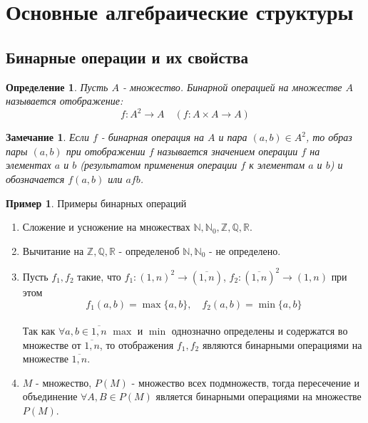 \documentclass[12pt,oneside]{article}
\newtheorem{determ}[theorem]{Определение}
\newtheorem{ffff}[theorem]{Замечание}
\theoremstyle{definition}
\newtheorem{example}[theorem]{Пример}
\newcommand{\ZZ}{\mathbb{Z}}
\newcommand{\NN}{\mathbb{N}}
\newcommand{\QQ}{\mathbb{Q}}
\newcommand{\RR}{\mathbb{R}}
\begin{document}
\tableofcontents


%
%
%
\newpage
\section{Основные алгебраические структуры}\label{ch_basic_alg_st}
\subsection{Бинарные операции и их свойства}

\begin{determ}
Пусть $A$ - множество. Бинарной операцией на множестве $A$ называется отображение:
\begin{equation}
f:A^2 \rightarrow A \quad (f: A \times A \rightarrow A)
\end{equation}
\end{determ}

\begin{ffff}
	Если $f$ - бинарная операция на $A$ и пара $(a,b) \in A^2$, то образ пары $(a,b)$ при отображении $f$ называется значением операции $f$ на элементах $a$ и $b$ (результатом применения операции $f$ к элементам $a$ и $b$) и обозначается $f(a,b)$ или $afb$.
\end{ffff}

\begin{example}\label{bin_examples}
	Примеры бинарных операций
	\begin{enumerate}
		\item Сложение и усножение на множествах $\NN, \NN_0, \ZZ, \QQ, \RR$.
		\item Вычитание на $\ZZ, \QQ, \RR$ - определеноб $\NN, \NN_0$ - не определено.
		\item Пусть $f_1, f_2$ такие, что $f_1:(1,n)^2 \rightarrow (\overline{1,n})$, $f_2:(\overline{1,n})^2 \rightarrow(1,n)$ при этом
		\begin{equation}
			f_1(a,b) = \max\{a,b\},\quad f_2(a,b) = \min\{a,b\}
		\end{equation}\\
		Так как $\forall a,b \in \overline{1,n}$ $\max$ и $\min$ однозначно определены и содержатся во множестве от $\overline{1,n}$, то отображения $f_1, f_2$ являются бинарными операциями на множестве $\overline{1,n}$.
		\item $M$ - множество, $P(M)$ - множество всех подмножеств, тогда пересечение и объединение $\forall A,B \in P(M)$ является бинарными операциями на множестве $P(M)$. 
	\end{enumerate}
\end{example}
\end{document}
